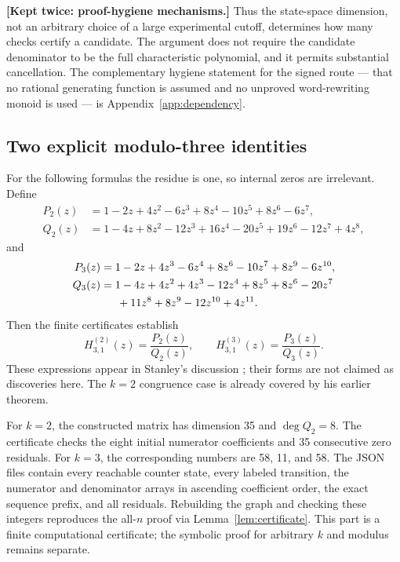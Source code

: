 \documentclass[11pt,letterpaper]{article}
\numberwithin{equation}{section}
\theoremstyle{definition}
\theoremstyle{remark}
\begin{document}
\noindent\textbf{[Kept twice: proof-hygiene mechanisms.]}
Thus the state-space dimension, not an arbitrary choice of a large
experimental cutoff, determines how many checks certify a candidate. The
argument does not require the candidate denominator to be the full
characteristic polynomial, and it permits substantial cancellation.
The complementary hygiene statement for the signed route --- that no
rational generating function is assumed and no unproved word-rewriting
monoid is used --- is Appendix~\ref{app:dependency}.

\subsection{Two explicit modulo-three identities}

For the following formulas the residue is one, so internal zeros are
irrelevant. Define
\begin{align*}
 P_2(z)&=1-2z+4z^2-6z^3+8z^4-10z^5+8z^6-6z^7,\\
 Q_2(z)&=1-4z+8z^2-12z^3+16z^4-20z^5+19z^6-12z^7+4z^8,
\end{align*}
and
\begin{align*}
 P_3(z)&=1-2z+4z^3-6z^4+8z^6-10z^7+8z^9-6z^{10},\\
 Q_3(z)&=1-4z+4z^2+4z^3-12z^4+8z^5+8z^6-20z^7\\
       &\hspace{1.5em}+11z^8+8z^9-12z^{10}+4z^{11}.
\end{align*}
Then the finite certificates establish
\begin{equation}
 H_{3,1}^{(2)}(z)=\frac{P_2(z)}{Q_2(z)},
 \qquad
 H_{3,1}^{(3)}(z)=\frac{P_3(z)}{Q_3(z)}.
 \label{eq:mod3}
\end{equation}
These expressions appear in Stanley's discussion
\cite[p.~24]{Stanley}; their forms are not claimed as discoveries here.
The $k=2$ congruence case is already covered by his earlier theorem.

For $k=2$, the constructed matrix has dimension 35 and $\deg Q_2=8$.
The certificate checks the eight initial numerator coefficients and 35
consecutive zero residuals. For $k=3$, the corresponding numbers are 58,
11, and 58. The JSON files contain every reachable counter state, every
labeled transition, the numerator and denominator arrays in ascending
coefficient order, the exact sequence prefix, and all residuals. Rebuilding
the graph and checking these integers reproduces the all-$n$ proof via
Lemma~\ref{lem:certificate}. This part is a finite computational certificate;
the symbolic proof for arbitrary $k$ and modulus remains separate.
\end{document}
